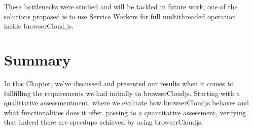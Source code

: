 These bottlenecks were studied and will be tackled in future work, one of the solutions proposed is to use Service Workers\cite{ServiceWorkers} for full multithreaded operation inside browserCloud.js.

\section{Summary}

In this Chapter, we've discussed and presented our results when it comes to fullfilling the requirements we had initially to browserCloudjs. Starting with a qualitiative assessmentment, where we evaluate how browserCloudjs behaves and what functionalities does it offer, passing to a quantitative assessment, verifying that indeed there are speedups achieved by using browserCloudjs.
